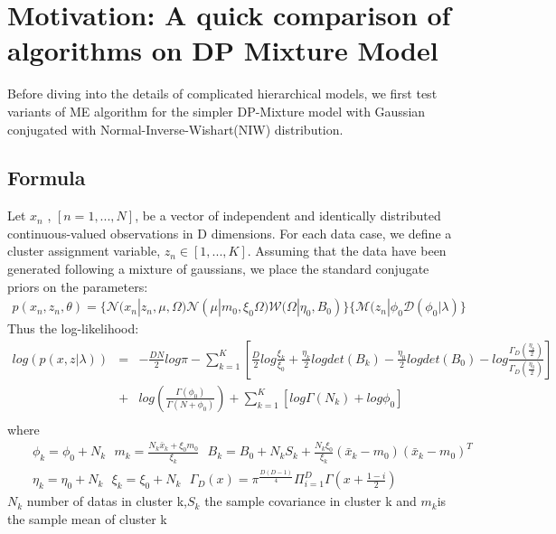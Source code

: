 \documentclass{article}
\begin{document}
\section{Motivation: A quick comparison of algorithms on DP Mixture Model}
Before diving into the details of complicated hierarchical models, we first test variants of ME algorithm for the simpler DP-Mixture model with Gaussian conjugated with Normal-Inverse-Wishart(NIW) distribution.
\subsection{Formula}
Let $x_{n}$ , $\left[n=1,...,N\right]$, be a vector of independent and identically distributed continuous-valued observations in D dimensions. 
For each data case, we define a cluster assignment variable, $z_{n}\in \left[1, . . . , K \right]$.
Assuming that the data have been generated following a mixture of gaussians, we place the standard conjugate priors on the parameters:
\begin{eqnarray*}
p(x_{n},z_{n},\theta)=\{\mathcal{N}(x_{n}|z_{n},\mu,\Omega)\mathcal{N}(\mu|m_{0},\xi_{0}\Omega)\mathcal{W}(\Omega|\eta_{0},B_{0})\}\{\mathcal{M}(z_n|\phi_{0}\mathcal{D}(\phi_{0}|\lambda)\}
\end{eqnarray*}
Thus the log-likelihood: 
\begin{eqnarray*}
log(p(x,z|\lambda))
&=&-\frac{D N}{2}log\pi-\sum_{k=1}^{K} [\frac{D}{2}log\frac{\xi_{k}}{\xi_{0}}+\frac{\eta_{k}}{2}log det(B_{k})-\frac{\eta_{0}}{2}log det(B_{0})
-log \frac{\Gamma_{D}(\frac{\eta_{k}}{2})}{\Gamma_{D}(\frac{\eta_{0}}{2})}]\\
&+&log(\frac{\Gamma(\phi_{0})}{\Gamma(N+\phi_{0})})+\sum_{k=1}^{K}[log \Gamma(N_{k})+log\phi_{0}]\\ 
\end{eqnarray*}
where 
\begin{eqnarray*}
&&\phi_{k}=\phi_{0}+N_{k}\ \ \ m_{k}=\frac{N_{k}\bar x_{k}+\xi_{0}m_{0}}{\xi_{k}}\ \ \ B_{k}=B_{0}+N_{k}S_{k}+\frac{N_{k}\xi_{0}}{\xi_{k}}(\bar x_{k}-m_{0})(\bar x_{k}-m_{0})^{T} \\
&&\eta_{k}=\eta_{0}+N_{k} \ \ \ \xi_{k}=\xi_{0}+N_{k}\ \ \ \Gamma_{D}(x)=\pi^{\frac{D(D-1)}{4}}\Pi_{i=1}^{D}\Gamma(x+\frac{1-i}{2})
\end{eqnarray*}
$N_{k}$ number of datas in cluster k,$S_{k}$ the sample covariance in cluster k and $m_{k}$is the sample mean of cluster k
\end{document}
